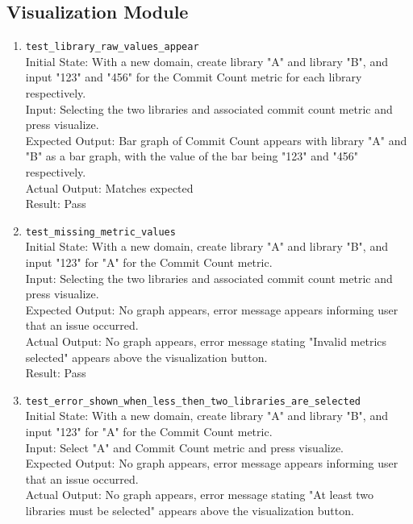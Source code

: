\documentclass[12pt, titlepage]{article}
\begin{document}
\subsection{Visualization Module}
\begin{enumerate}
    \item \texttt{test\_library\_raw\_values\_appear} \label{test-library-raw-values-appear}
    \\Initial State: With a new domain, create library "A" and library "B", and input "123" and "456" for the Commit Count metric for each library respectively.
    \\Input: Selecting the two libraries and associated commit count metric and press visualize.
    \\Expected Output: Bar graph of Commit Count appears with library "A" and "B" as a bar graph, with the value of the bar being "123" and "456" respectively.
    \\Actual Output: Matches expected
    \\Result: Pass
    \item \texttt{test\_missing\_metric\_values} \label{test-missing-metric-values}
    \\Initial State: With a new domain, create library "A" and library "B", and input "123" for "A" for the Commit Count metric.
    \\Input: Selecting the two libraries and associated commit count metric and press visualize.
    \\Expected Output: No graph appears, error message appears informing user that an issue occurred.
    \\Actual Output: No graph appears, error message stating "Invalid metrics selected" appears above the visualization button.
    \\Result: Pass
    \item \texttt{test\_error\_shown\_when\_less\_then\_two\_libraries\_are\_selected} \label{test-error-shown-when-less-then-two-libraries-are-selected}
    \\Initial State: With a new domain, create library "A" and library "B", and input "123" for "A" for the Commit Count metric.
    \\Input: Select "A" and Commit Count metric and press visualize.
    \\Expected Output: No graph appears, error message appears informing user that an issue occurred.
    \\Actual Output: No graph appears, error message stating "At least two libraries must be selected" appears above the visualization button.

\end{enumerate}
\end{document}
